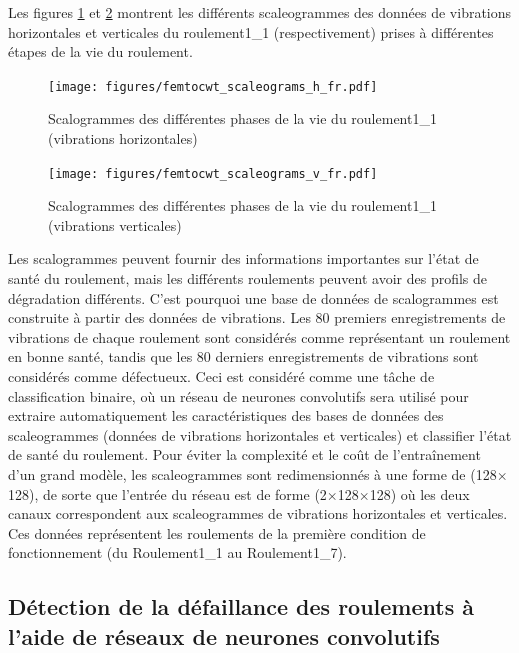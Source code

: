 Les figures \ref{fig:bearings_fault_progress_scaleograms_h} et \ref{fig:bearings_fault_progress_scaleograms_v} montrent les différents scaleogrammes des données de vibrations horizontales et verticales du roulement1\_1 (respectivement) prises à différentes étapes de la vie du roulement.


\begin{figure}[h]
	\centering
	\texttt{[image: figures/femtocwt\_scaleograms\_h\_fr.pdf]}
	\caption{Scalogrammes des différentes phases de la vie du roulement1\_1 (vibrations horizontales)}%
	\label{fig:bearings_fault_progress_scaleograms_h}
\end{figure}

\begin{figure}[h]
	\centering
	\texttt{[image: figures/femtocwt\_scaleograms\_v\_fr.pdf]}
	\caption{Scalogrammes des différentes phases de la vie du roulement1\_1 (vibrations verticales)}%
	\label{fig:bearings_fault_progress_scaleograms_v}
\end{figure}

Les scalogrammes peuvent fournir des informations importantes sur l'état de santé du roulement, mais les différents roulements peuvent avoir des profils de dégradation différents. C'est pourquoi une base de données de scalogrammes est construite à partir des données de vibrations. Les 80 premiers enregistrements de vibrations de chaque roulement sont considérés comme représentant un roulement en bonne santé, tandis que les 80 derniers enregistrements de vibrations sont considérés comme défectueux. Ceci est considéré comme une tâche de classification binaire, où un réseau de neurones convolutifs sera utilisé pour extraire automatiquement les caractéristiques des bases de données des scaleogrammes (données de vibrations horizontales et verticales) et classifier l'état de santé du roulement. Pour éviter la complexité et le coût de l'entraînement d'un grand modèle, les scaleogrammes sont redimensionnés à une forme de (128$\times$128), de sorte que l'entrée du réseau est de forme (2$\times$128$\times$128) où les deux canaux correspondent aux scaleogrammes de vibrations horizontales et verticales. Ces données représentent les roulements de la première condition de fonctionnement (du Roulement1\_1 au Roulement1\_7).

\subsection{Détection de la défaillance des roulements à l'aide de réseaux de neurones convolutifs}%
\label{sub:detecting_bearings_failure_using_convolutional_neural_networks}

